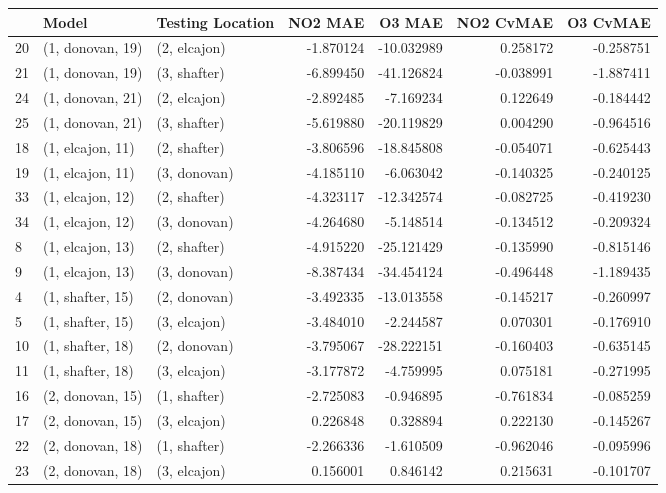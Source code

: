 \begin{tabular}{lllrrrr}
\toprule
{} &             Model & Testing Location &    NO2 MAE &     O3 MAE &  NO2 CvMAE &  O3 CvMAE \\
\midrule
20 &  (1, donovan, 19) &     (2, elcajon) &  -1.870124 & -10.032989 &   0.258172 & -0.258751 \\
21 &  (1, donovan, 19) &     (3, shafter) &  -6.899450 & -41.126824 &  -0.038991 & -1.887411 \\
24 &  (1, donovan, 21) &     (2, elcajon) &  -2.892485 &  -7.169234 &   0.122649 & -0.184442 \\
25 &  (1, donovan, 21) &     (3, shafter) &  -5.619880 & -20.119829 &   0.004290 & -0.964516 \\
18 &  (1, elcajon, 11) &     (2, shafter) &  -3.806596 & -18.845808 &  -0.054071 & -0.625443 \\
19 &  (1, elcajon, 11) &     (3, donovan) &  -4.185110 &  -6.063042 &  -0.140325 & -0.240125 \\
33 &  (1, elcajon, 12) &     (2, shafter) &  -4.323117 & -12.342574 &  -0.082725 & -0.419230 \\
34 &  (1, elcajon, 12) &     (3, donovan) &  -4.264680 &  -5.148514 &  -0.134512 & -0.209324 \\
8  &  (1, elcajon, 13) &     (2, shafter) &  -4.915220 & -25.121429 &  -0.135990 & -0.815146 \\
9  &  (1, elcajon, 13) &     (3, donovan) &  -8.387434 & -34.454124 &  -0.496448 & -1.189435 \\
4  &  (1, shafter, 15) &     (2, donovan) &  -3.492335 & -13.013558 &  -0.145217 & -0.260997 \\
5  &  (1, shafter, 15) &     (3, elcajon) &  -3.484010 &  -2.244587 &   0.070301 & -0.176910 \\
10 &  (1, shafter, 18) &     (2, donovan) &  -3.795067 & -28.222151 &  -0.160403 & -0.635145 \\
11 &  (1, shafter, 18) &     (3, elcajon) &  -3.177872 &  -4.759995 &   0.075181 & -0.271995 \\
16 &  (2, donovan, 15) &     (1, shafter) &  -2.725083 &  -0.946895 &  -0.761834 & -0.085259 \\
17 &  (2, donovan, 15) &     (3, elcajon) &   0.226848 &   0.328894 &   0.222130 & -0.145267 \\
22 &  (2, donovan, 18) &     (1, shafter) &  -2.266336 &  -1.610509 &  -0.962046 & -0.095996 \\
23 &  (2, donovan, 18) &     (3, elcajon) &   0.156001 &   0.846142 &   0.215631 & -0.101707 \\

\end{tabular}
